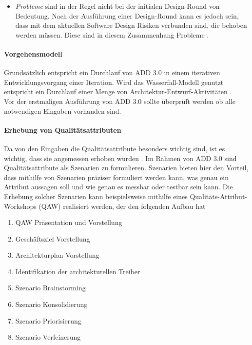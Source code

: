 \begin{itemize}
\begin{itemize}
\item \emph{Probleme} sind in der Regel nicht bei der initialen Design-Round von Bedeutung. Nach der Ausführung einer Design-Round kann es jedoch sein, dass mit dem aktuellen Software Design Risiken verbunden sind, die behoben werden müssen. Diese sind in diesem Zusammenhang Probleme \cite{Cer01}.\\
\end{itemize}
\end{itemize}

\paragraph{Vorgehensmodell}
Grundsätzlich entspricht ein Durchlauf von ADD 3.0 in einem iterativen Entwicklungsvorgang einer Iteration. Wird das Wasserfall-Modell genutzt entspricht ein Durchlauf einer Menge von Architektur-Entwurf-Aktivitäten \cite{Cer01}.\\

Vor der erstmaligen Ausführung von ADD 3.0 sollte überprüft werden ob alle notwendigen Eingaben vorhanden sind.\\

\paragraph{Erhebung von Qualitätsattributen}
Da von den Eingaben die Qualitätsattribute besonders wichtig sind, ist es wichtig, dass sie angemessen erhoben wurden \cite{Cer01}. Im Rahmen von ADD 3.0 sind Qualitätsattribute als Szenarien zu formulieren. Szenarien bieten hier den Vorteil, dass mithilfe von Szenarien präziser formuliert werden kann, was genau ein Attribut aussagen soll und wie genau es messbar oder testbar sein kann. Die Erhebung solcher Szenarien kann beispielsweise mithilfe eines Qualitäts-Attribut-Workshops (QAW) realisiert werden, der den folgenden Aufbau hat \cite{Cer01}\\

\begin{enumerate}
\item QAW Präsentation und Vorstellung
\item Geschäftsziel Vorstellung
\item Architekturplan Vorstellung
\item Identifikation der architekturellen Treiber
\item Szenario Brainstorming
\item Szenario Konsolidierung
\item Szenario Priorisierung
\item Szenario Verfeinerung \\
\end{enumerate}

